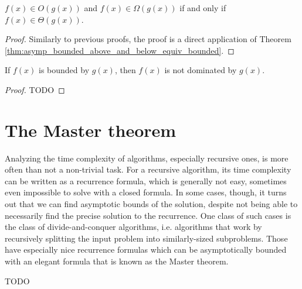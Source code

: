 \begin{theorem}
    \label{thm:big_o_and_omega_equiv_theta}
    \leanok
    $f(x) \in O(g(x))$ and $f(x) \in \Omega(g(x))$ if and only if $f(x) \in \Theta(g(x))$.
\end{theorem}

\begin{proof}
    \leanok
    Similarly to previous proofs, the proof is a direct application of Theorem 
    \ref{thm:asymp_bounded_above_and_below_equiv_bounded}.
\end{proof}

\begin{lemma}
    \label{thm:asymp_bounded_imp_not_dominated}
    \leanok
    If $f(x)$ is bounded by $g(x)$, then $f(x)$ is not dominated by $g(x)$.
\end{lemma}

\begin{proof}
    TODO 
\end{proof}
    


\section{The Master theorem}

Analyzing the time complexity of algorithms, especially recursive ones, is more often 
than not a non-trivial task. For a recursive algorithm, its time complexity can be 
written as a recurrence formula, which is generally not easy, sometimes even impossible 
to solve with a closed formula. In some cases, though, it turns out that we can find 
asymptotic bounds of the solution, despite not being able to necessarily find the 
precise solution to the recurrence. One class of such cases is the class of 
divide-and-conquer algorithms, i.e. algorithms that work by recursively splitting the input 
problem into similarly-sized subproblems. Those have especially nice recurrence formulas 
which can be asymptotically bounded with an elegant formula that is known as the Master theorem.

\begin{theorem}
TODO
\end{theorem}
